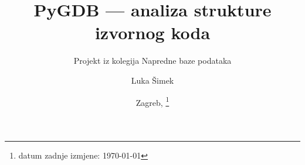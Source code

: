 \documentclass[11pt]{scrartcl}
\date{\displaydate{date}}
\begin{document}
\title{PyGDB --- analiza strukture izvornog koda} \thispagestyle{empty}
\subtitle{Projekt iz kolegija Napredne baze podataka}
\author{Luka Šimek}
\date{Zagreb, \footnote{datum zadnje izmjene: \today}}
\maketitle
\bigskip
\tableofcontents
\clearpage
{}
\newpage


\newpage

\newpage

\newpage

\newpage

\newpage

\newpage
\printbibliography
\end{document}
